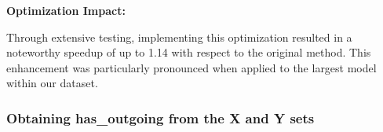 \textbf{Optimization Impact:}

Through extensive testing, implementing this optimization resulted in a noteworthy speedup of up to 1.14 with respect to the original method. This enhancement was particularly pronounced when applied to the largest model within our dataset.

%
%
%
%
%
%


\subsubsection{Obtaining has\_outgoing from the X and Y sets}

